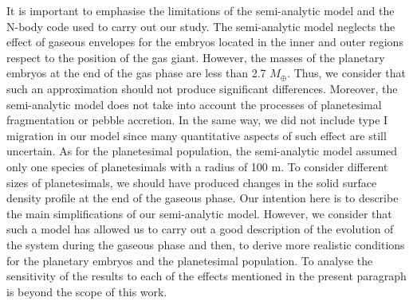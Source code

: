 \documentclass{aa}
\begin{document}
It is important to emphasise the limitations of the semi-analytic model and the N-body code used to carry out our study.
The semi-analytic model neglects the effect of gaseous envelopes for the embryos located in the inner and outer
regions respect to the position of the gas giant. However, the masses of the planetary embryos at the end of the gas phase
are less than 2.7 $M_{\oplus}$. Thus, we consider that such an approximation should not produce significant differences. Moreover,
the semi-analytic model does not take into account the processes of planetesimal fragmentation or pebble accretion. In the same way, we
did not include type I migration in our model since many quantitative aspects of such effect are still uncertain. As for the
planetesimal population, the semi-analytic model assumed only one species of planetesimals with a radius of 100 m. To consider
different sizes of planetesimals, we should have produced changes in the solid surface density profile at the end of the gaseous phase.
Our intention here is to describe the main simplifications of our semi-analytic model. However, we consider that such a model has allowed us
to carry out a good description of the evolution of the system during the gaseous phase and then, to derive more realistic conditions
for the planetary embryos and the planetesimal population. To analyse the sensitivity of the results to each of the effects mentioned
in the present paragraph is beyond the scope of this work.
\end{document}
